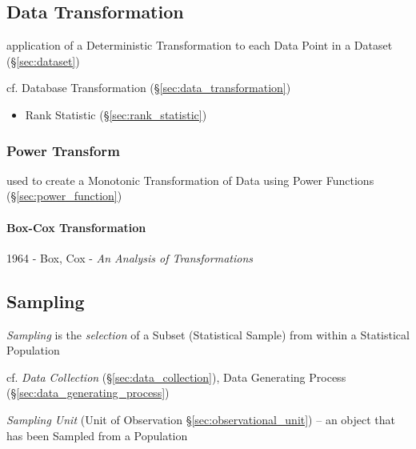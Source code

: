 \subsection{Data Transformation}\label{sec:dataset_transformation}

application of a Deterministic Transformation to each Data Point in a Dataset
(\S\ref{sec:dataset})

\fist cf. Database Transformation (\S\ref{sec:data_transformation})

\begin{itemize}
  \item Rank Statistic (\S\ref{sec:rank_statistic})
\end{itemize}



\subsubsection{Power Transform}\label{sec:power_transform}

used to create a Monotonic Transformation of Data using Power Functions
(\S\ref{sec:power_function})



\paragraph{Box-Cox Transformation}\label{sec:boxcox_transformation}\hfill

1964 - Box, Cox - \emph{An Analysis of Transformations}



\subsection{Sampling}\label{sec:sampling}

\emph{Sampling} is the \emph{selection} of a Subset (Statistical Sample) from
within a Statistical Population

\fist cf. \emph{Data Collection} (\S\ref{sec:data_collection}), Data Generating
Process (\S\ref{sec:data_generating_process})

\fist \emph{Sampling Unit} (Unit of Observation \S\ref{sec:observational_unit})
-- an object that has been Sampled from a Population

